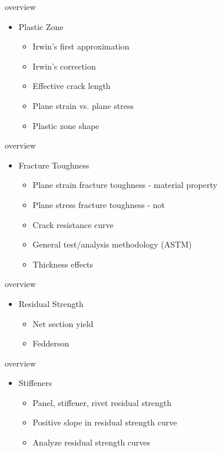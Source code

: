 \documentclass[10pt]{beamer}
\begin{document}
\begin{frame}{overview}
	\begin{itemize}[<+->]
		\item Plastic Zone
		\begin{itemize}[<+->]
			\item Irwin's first approximation
			\item Irwin's correction
			\item Effective crack length
			\item Plane strain vs. plane stress
			\item Plastic zone shape
		\end{itemize}
	\end{itemize}
\end{frame}

\begin{frame}{overview}
	\begin{itemize}[<+->]
		\item Fracture Toughness
		\begin{itemize}[<+->]
			\item Plane strain fracture toughness - material property
			\item Plane stress fracture toughness - not
			\item Crack resistance curve
			\item General test/analysis methodology (ASTM)
			\item Thickness effects
		\end{itemize}
	\end{itemize}
\end{frame}

\begin{frame}{overview}
	\begin{itemize}[<+->]
		\item Residual Strength
		\begin{itemize}[<+->]
			\item Net section yield
			\item Fedderson
		\end{itemize}
	\end{itemize}
\end{frame}

\begin{frame}{overview}
	\begin{itemize}[<+->]
		\item Stiffeners
		\begin{itemize}[<+->]
			\item Panel, stiffener, rivet residual strength
			\item Positive slope in residual strength curve
			\item Analyze residual strength curves
		\end{itemize}
	\end{itemize}
\end{frame}
\end{document}
